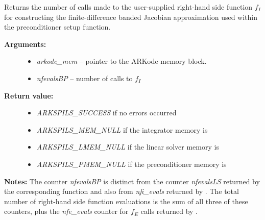 \documentclass[letterpaper,10pt,english]{sphinxmanual}
\begin{document}

\begin{fulllineitems}
\label{c_interface/Preconditioners:c.ARKBandPrecGetNumRhsEvals}
Returns the number of calls made to the user-supplied
right-hand side function \(f_I\) for constructing the
finite-difference banded Jacobian approximation used within the
preconditioner setup function.
\begin{description}
\item[{\textbf{Arguments:}}] \leavevmode\begin{itemize}
\item {} 
\emph{arkode\_mem} -- pointer to the ARKode memory block.

\item {} 
\emph{nfevalsBP} -- number of calls to \(f_I\)

\end{itemize}

\item[{\textbf{Return value:}}] \leavevmode\begin{itemize}
\item {} 
\emph{ARKSPILS\_SUCCESS} if no errors occurred

\item {} 
\emph{ARKSPILS\_MEM\_NULL} if the integrator memory is 

\item {} 
\emph{ARKSPILS\_LMEM\_NULL} if the linear solver memory is 

\item {} 
\emph{ARKSPILS\_PMEM\_NULL} if the preconditioner memory is 

\end{itemize}

\end{description}

\textbf{Notes:}  The counter \emph{nfevalsBP} is distinct from the counter
\emph{nfevalsLS} returned by the corresponding function
{\hyperref[c_interface/User_callable:c.ARKSpilsGetNumRhsEvals]{\emph{}}} and also from \emph{nfi\_evals} returned by
{\hyperref[c_interface/User_callable:c.ARKodeGetNumRhsEvals]{\emph{}}}.  The total number of right-hand
side function evaluations is the sum of all three of these
counters, plus the \emph{nfe\_evals} counter for \(f_E\) calls
returned by {\hyperref[c_interface/User_callable:c.ARKodeGetNumRhsEvals]{\emph{}}}.

\end{fulllineitems}
\end{document}
